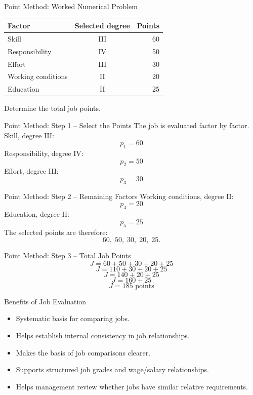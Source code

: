 \documentclass[aspectratio=169,10pt]{beamer}
\begin{document}
\begin{frame}{Point Method: Worked Numerical Problem}
\centering\small
\begin{tabular}{l|c|r}
\toprule
Factor & Selected degree & Points\\
\midrule
Skill & III & 60\\
Responsibility & IV & 50\\
Effort & III & 30\\
Working conditions & II & 20\\
Education & II & 25\\
\bottomrule
\end{tabular}
\vspace{0.2cm}
Determine the total job points.
\end{frame}

\begin{frame}{Point Method: Step 1 -- Select the Points}
The job is evaluated factor by factor.
\pause
Skill, degree III:
\[p_1=60\]
\pause
Responsibility, degree IV:
\[p_2=50\]
\pause
Effort, degree III:
\[p_3=30\]
\end{frame}

\begin{frame}{Point Method: Step 2 -- Remaining Factors}
Working conditions, degree II:
\pause
\[p_4=20\]
\pause
Education, degree II:
\[p_5=25\]
\pause
The selected points are therefore:
\[60,\;50,\;30,\;20,\;25.\]
\end{frame}

\begin{frame}{Point Method: Step 3 -- Total Job Points}
\[J=60+50+30+20+25\]
\pause
\[J=110+30+20+25\]
\pause
\[J=140+20+25\]
\pause
\[J=160+25\]
\pause
\[\boxed{J=185\text{ points}}\]
\end{frame}

\begin{frame}{Benefits of Job Evaluation}
\begin{itemize}
  \item Systematic basis for comparing jobs.
  \item Helps establish internal consistency in job relationships.
  \item Makes the basis of job comparisons clearer.
  \item Supports structured job grades and wage/salary relationships.
  \item Helps management review whether jobs have similar relative requirements.
\end{itemize}
\end{frame}
\end{document}
